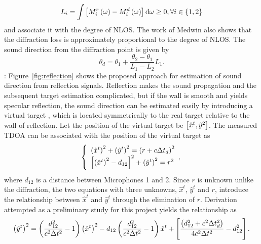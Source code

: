 \documentclass[letterpaper, 10 pt, conference]{ieeeconf}  %
\begin{document}
\begin{equation}\label{eq:loss}
L_i = \int \left [ M_i^r\left ( \omega \right ) - M_i^d\left ( \omega \right ) \right ] {\rm d} \omega \geq 0, \forall i \in \left \{ 1,2 \right \}  
\end{equation}
and associate it with the degree of NLOS.  The work of Medwin also shows that the diffraction loss is approximately proportional to the degree of NLOS.  The sound direction from the diffraction point is given by
\begin{equation}\label{eq:direction_diffraction}
\theta_d = \theta_1 + \frac{\theta_2 - \theta_1}{L_1 - L_2} L_1.   
\end{equation}
: Figure~\ref{fig:reflection} shows the proposed approach for estimation of sound direction from reflection signals.  Reflection makes the sound propagation and the subsequent target estimation complicated, but if the wall is smooth and yields specular reflection, the sound direction can be estimated easily by introducing a virtual target \cite{pulkki1997}, which is located symmetrically to the real target relative to the wall of reflection.  Let the position of the virtual target be $\left [ \hat x^t, \hat y^2 \right ]$.  The measured TDOA can be associated with the position of the virtual target as\\
\begin{equation}\label{eq:reflection}
\left\{
\begin{array}{ll}
\left ( \hat x^t \right )^2 + \left ( \hat y^t \right )^2 = \left ( r + c \Delta t_d \right )^2\\
\left [ \left ( \hat x^t \right )^2 - d_{12} \right ]^2 + \left ( \hat y^t \right )^2 = r^2
\end{array},
\right.
\end{equation}
where $d_{12}$ is a distance between Microphones 1 and 2.  Since $r$ is unknown unlike the diffraction, the two equations with three unknowns, $\hat x^t$, $\hat y^t$ and $r$, introduce the relationship between $\hat x^t$ and $\hat y^t$ through the elimination of $r$.  Derivation attempted as a preliminary study for this project yields the relationship as
\begin{equation}\label{eq:estimation_reflection}
\left ( \hat y^t \right )^2 = \left ( \frac{d_{12}^2}{c^2 \Delta t^2} - 1 \right ) \left ( \hat x^t \right )^2 - d_{12} \left ( \frac{d_{12}^2}{c^2 \Delta t^2} - 1 \right ) \hat x^t + \left [ \frac{\left ( d_{12}^2 + c^2 \Delta t_d^2 \right )}{4 c^2 \Delta t^2} - d_{12}^2 \right ].  
\end{equation}
\end{document}
